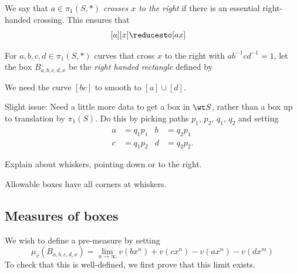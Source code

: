 We say that $a \in \pi_1(S, \ast)$ \emph{crosses $x$ to the
  right} if there is an essential right-handed crossing.
  This ensures that
  \begin{align}
    \label{eq:cross-red1}[a][x] &\reducesto [ax]
  \end{align}

For $a,b,c,d \in \pi_1(S,\ast)$ curves that cross $x$ to
the right with $a b^{-1} c d^{-1} = 1$,
let the box $B_{a,b,c,d,x}$
be the \emph{right handed rectangle} defined by 

\begin{figure}
\end{figure}

We need the curve $[bc]$ to smooth to $[a] \cup [d]$.

Slight issue: Need a little more data to get a box in $\wt S$, rather
than a box up to translation by $\pi_1(S)$. Do this by picking
paths $p_1$, $p_2$, $q_1$, $q_2$ and setting
\begin{align*}
  a &= q_1p_1 & b &= q_2p_1\\
  c &= q_1p_2 & d &= q_2p_2.
\end{align*}

\begin{figure}
\end{figure}

Explain about whiskers, pointing down or to the right.


\begin{figure}
\end{figure}

Allowable boxes
have all corners at whiskers.


\subsection{Measures of boxes}

We wish to define a pre-measure by setting
\[
\mu_{v}(B_{a,b,c,d,x})=\lim_{n \to \infty}v(bx^n) + v(cx^n)-v(ax^n) - v(dx^m)
\]
To check that this is well-defined, we first prove that this limit
exists.

